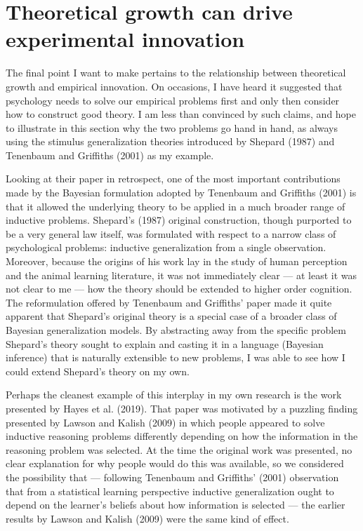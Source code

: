 \documentclass[
  english,
  doc]{apa6}
\begin{document}
\hypertarget{theoretical-growth-can-drive-experimental-innovation}{%
\section{Theoretical growth can drive experimental innovation}\label{theoretical-growth-can-drive-experimental-innovation}}

\noindent
The final point I want to make pertains to the relationship between theoretical growth and empirical innovation. On occasions, I have heard it suggested that psychology needs to solve our empirical problems first and only then consider how to construct good theory. I am less than convinced by such claims, and hope to illustrate in this section why the two problems go hand in hand, as always using the stimulus generalization theories introduced by Shepard (1987) and Tenenbaum and Griffiths (2001) as my example.

Looking at their paper in retrospect, one of the most important contributions made by the Bayesian formulation adopted by Tenenbaum and Griffiths (2001) is that it allowed the underlying theory to be applied in a much broader range of inductive problems. Shepard's (1987) original construction, though purported to be a very general law itself, was formulated with respect to a narrow class of psychological problems: inductive generalization from a single observation. Moreover, because the origins of his work lay in the study of human perception and the animal learning literature, it was not immediately clear --- at least it was not clear to me --- how the theory should be extended to higher order cognition. The reformulation offered by Tenenbaum and Griffiths' paper made it quite apparent that Shepard's original theory is a special case of a broader class of Bayesian generalization models. By abstracting away from the specific problem Shepard's theory sought to explain and casting it in a language (Bayesian inference) that is naturally extensible to new problems, I was able to see how I could extend Shepard's theory on my own.

Perhaps the cleanest example of this interplay in my own research is the work presented by Hayes et al. (2019). That paper was motivated by a puzzling finding presented by Lawson and Kalish (2009) in which people appeared to solve inductive reasoning problems differently depending on how the information in the reasoning problem was selected. At the time the original work was presented, no clear explanation for why people would do this was available, so we considered the possibility that --- following Tenenbaum and Griffiths' (2001) observation that from a statistical learning perspective inductive generalization ought to depend on the learner's beliefs about how information is selected --- the earlier results by Lawson and Kalish (2009) were the same kind of effect.
\end{document}
